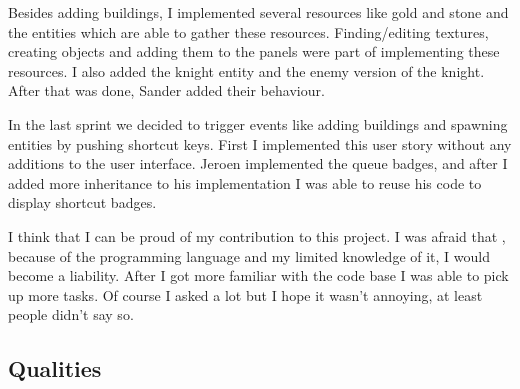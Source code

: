 Besides adding buildings, I implemented several resources like gold and stone and the entities which are able to gather these resources. Finding/editing textures, creating objects and adding them to the panels were part of implementing these resources. I also added the knight entity and the enemy version of the knight. After that was done, Sander added their behaviour.

In the last sprint we decided to trigger events like adding buildings and spawning entities by pushing shortcut keys. First I implemented this user story without any additions to the user interface. Jeroen implemented the queue badges, and after I added more inheritance to his implementation I was able to reuse his code to display shortcut badges.

I think that I can be proud of my contribution to this project. I was afraid that , because of the programming language and my limited knowledge of it, I would become a liability. After I got more familiar with the code base I was able to pick up more tasks. Of course I asked a lot but I hope it wasn't annoying, at least people didn't say so.

\subsection{Qualities}



